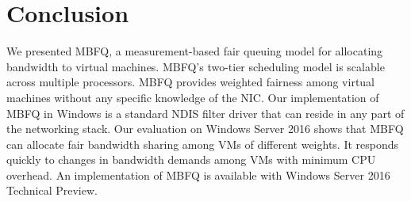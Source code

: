 \section{Conclusion}
\label{sec:conclusion}

We presented MBFQ, a measurement-based fair queuing model for allocating bandwidth to virtual machines.
MBFQ's two-tier scheduling model is scalable across multiple processors.  MBFQ provides weighted
fairness among virtual machines without any specific knowledge of the NIC.  Our implementation 
of MBFQ in Windows is a standard NDIS filter driver that can reside in any part of the networking stack.  Our evaluation
on Windows Server 2016 shows that MBFQ can allocate fair bandwidth sharing among VMs of different weights. It
responds quickly to changes in bandwidth demands among VMs with minimum CPU overhead.  An implementation of 
MBFQ is available with Windows Server 2016 Technical Preview.




